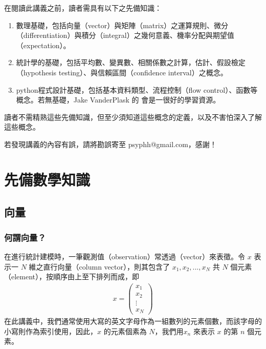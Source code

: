 \documentclass[letterpaper,10pt,english]{sphinxmanual}
\begin{document}
在閱讀此講義之前，讀者需具有以下之先備知識：
\begin{enumerate}
%
\item {} 
數理基礎，包括向量（vector）與矩陣（matrix）之運算規則、微分（differentiation）與積分（integral）之幾何意義、機率分配與期望值（expectation）。

\item {} 
統計學的基礎，包括平均數、變異數、相關係數之計算，估計、假設檢定（hypothesis testing）、與信賴區間（confidence interval）之概念。

\item {} 
python程式設計基礎，包括基本資料類型、流程控制（flow control）、函數等概念。若無基礎，Jake VanderPlask 的  會是一很好的學習資源。

\end{enumerate}

讀者不需精熟這些先備知識，但至少須知道這些概念的定義，以及不害怕深入了解這些概念。

若發現講義的內容有誤，請將勘誤寄至 psyphh@gmail.com，感謝！


\chapter{先備數學知識}
\label{\detokenize{notebook/mathematics-prerequisite:id1}}\label{\detokenize{notebook/mathematics-prerequisite::doc}}

\section{向量}
\label{\detokenize{notebook/mathematics-prerequisite:id2}}

\subsection{何謂向量？}
\label{\detokenize{notebook/mathematics-prerequisite:id3}}
在進行統計建模時，一筆觀測值（observation）常透過（vector）來表徵。令 \(x\) 表示一 \(N\) 維之直行向量（column vector），則其包含了 \(x_1,x_2,...,x_N\) 共 \(N\) 個元素（element），按順序由上至下排列而成，即
\begin{equation*}
\begin{split}
x =
\begin{pmatrix}
x_1 \\
x_2 \\
\vdots \\
x_N
\end{pmatrix}
\end{split}
\end{equation*}
在此講義中，我們通常使用大寫的英文字母作為一組數列的元素個數，而該字母的小寫則作為索引使用，因此，\(x\) 的元素個素為 \(N\)，我們用\(x_n\) 來表示 \(x\) 的第 \(n\) 個元素。
\end{document}
